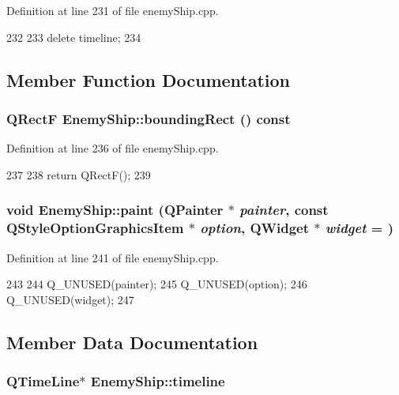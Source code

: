 Definition at line 231 of file enemyShip.cpp.


\begin{DoxyCode}
232 {
233     delete timeline;
234 }
\end{DoxyCode}


\subsection{Member Function Documentation}
\hypertarget{class_enemy_ship_a686ecac9600cf96356853ecda872ded0}{
\subsubsection[{boundingRect}]{\setlength{\rightskip}{0pt plus 5cm}QRectF EnemyShip::boundingRect () const}}
\label{class_enemy_ship_a686ecac9600cf96356853ecda872ded0}


Definition at line 236 of file enemyShip.cpp.


\begin{DoxyCode}
237 {
238     return QRectF();
239 }
\end{DoxyCode}
\hypertarget{class_enemy_ship_acdd59ef427b1f6919dc6bb32ff45bdc6}{
\subsubsection[{paint}]{\setlength{\rightskip}{0pt plus 5cm}void EnemyShip::paint (QPainter $\ast$ {\em painter}, \/  const QStyleOptionGraphicsItem $\ast$ {\em option}, \/  QWidget $\ast$ {\em widget} = {})}}
\label{class_enemy_ship_acdd59ef427b1f6919dc6bb32ff45bdc6}


Definition at line 241 of file enemyShip.cpp.


\begin{DoxyCode}
243 {
244     Q_UNUSED(painter);
245     Q_UNUSED(option);
246     Q_UNUSED(widget);
247 }
\end{DoxyCode}


\subsection{Member Data Documentation}
\hypertarget{class_enemy_ship_aef8e031f014691c7c6cc66864d505f45}{
\subsubsection[{timeline}]{\setlength{\rightskip}{0pt plus 5cm}QTimeLine$\ast$ {\bf EnemyShip::timeline}}}
\label{class_enemy_ship_aef8e031f014691c7c6cc66864d505f45}


